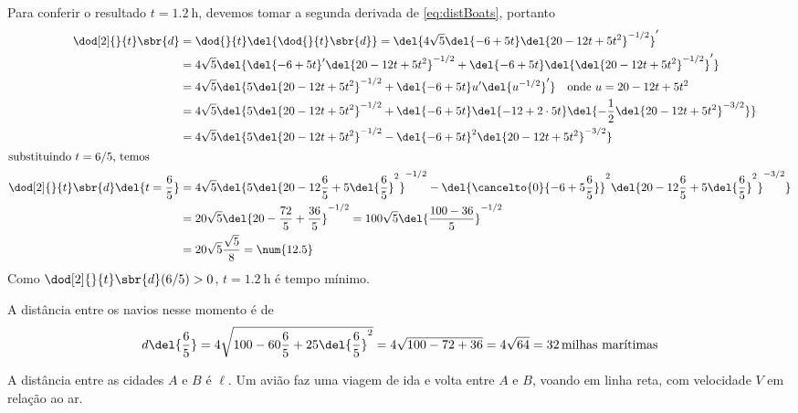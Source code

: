 \documentclass[]{IMTexam}
\begin{document}
\begin{questions}
\begin{solution}
		Para conferir o resultado $ t=\SI{1.2}{\hour} $, devemos tomar a segunda derivada de \ref{eq:distBoats}, portanto
		\begin{align*}
			\dod[2]{}{t}\sbr{d}                     & =\dod{}{t}\del{\dod{}{t}\sbr{d}}=\del{4\sqrt{5}\del{-6+5t}\del{20-12t+5t^{2}}^{-1/2}}'                                                                                 \\
			                                        & =4\sqrt{5}\del{\del{-6+5t}'\del{20-12t+5t^{2}}^{-1/2}+\del{-6+5t}\del{\del{20-12t+5t^{2}}^{-1/2}}'}                                                                    \\
			                                        & =4\sqrt{5}\del{5\del{20-12t+5t^{2}}^{-1/2}+\del{-6+5t}u'\del{u^{-1/2}}'}\quad\text{onde }u=20-12t+5t^{2}                                                               \\
			                                        & =4\sqrt{5}\del{5\del{20-12t+5t^{2}}^{-1/2}+\del{-6+5t}\del{-12+2\cdot5t}\del{-\dfrac{1}{2}\del{20-12t+5t^{2}}^{-3/2}}}                                                 \\
			                                        & =4\sqrt{5}\del{5\del{20-12t+5t^{2}}^{-1/2}-\del{-6+5t}^{2}\del{20-12t+5t^{2}}^{-3/2}}                                                                                  \\
			\intertext{substituindo $ t=6/5 $, temos}
			\dod[2]{}{t}\sbr{d}\del{t=\dfrac{6}{5}} & =4\sqrt{5}\del{5\del{20-12\dfrac{6}{5}+5\del{\dfrac{6}{5}}^{2}}^{-1/2}-\del{\cancelto{0}{-6+5\dfrac{6}{5}}}^{2}\del{20-12\dfrac{6}{5}+5\del{\dfrac{6}{5}}^{2}}^{-3/2}} \\
			                                        & =20\sqrt{5}\del{20-\dfrac{72}{5}+\dfrac{36}{5}}^{-1/2}=100\sqrt{5}\del{\dfrac{100-36}{5}}^{-1/2}                                                                       \\
			                                        & =20\sqrt{5}\dfrac{\sqrt{5}}{8}=\num{12.5}
		\end{align*}
		Como $ \dod[2]{}{t}\sbr{d}(6/5)>0 $, $ t=\SI{1.2}{\hour} $ é tempo mínimo.

		A distância entre os navios nesse momento é de
		\[ d\del{\dfrac{6}{5}}=4\sqrt{100-60\dfrac{6}{5}+25\del{\dfrac{6}{5}}^{2}}=4\sqrt{100-72+36}=4\sqrt{64}=32\,\text{milhas marítimas} \]
	\end{solution}

	\question
	A distância entre as cidades $ A $ e $ B $ é $\ell$. Um avião faz uma viagem de ida e volta entre $ A $ e $ B $, voando em linha reta, com velocidade $ V $ em relação ao ar.


\end{questions}
\end{document}
